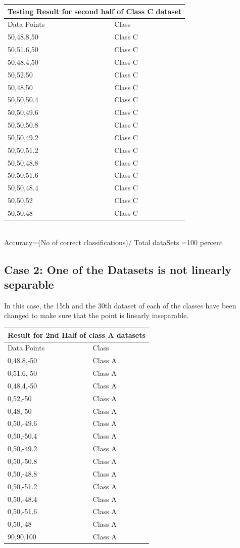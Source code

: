 \documentclass[letterpaper]{article}
\begin{document}
\begin{tabular}{ |p{5cm}||p{5cm}| }
 \hline
 \multicolumn{2}{|c|}{Testing Result for second half of Class C dataset} \\
 \hline
Data Points& Class\\
 \hline
50,48.8,50 & Class C \\
50,51.6,50 & Class C \\
50,48.4,50 & Class C \\
50,52,50 & Class C \\
50,48,50 & Class C \\
50,50,50.4 & Class C \\
50,50,49.6 & Class C \\
50,50,50.8 & Class C \\
50,50,49.2 & Class C \\
50,50,51.2 & Class C \\
50,50,48.8 & Class C \\
50,50,51.6 & Class C \\
50,50,48.4 & Class C \\
50,50,52 & Class C \\
50,50,48 & Class C \\
 \hline

\end {tabular} \\

Accuracy=(No of correct classifications)/ Total dataSets =100 percent 


\subsection {Case 2: One of the Datasets is not linearly separable}
In this case, the 15th and the 30th dataset of each of the classes have been changed to make sure that the point is linearly inseparable. 

  \begin{tabular}{ |p{5cm}||p{5cm}| }
 \hline
 \multicolumn{2}{|c|}{Result for 2nd Half of class A datasets} \\
 \hline
Data Points& Class\\
 \hline
0,48.8,-50 & Class A \\
0,51.6,-50 & Class A \\
0,48.4,-50 &  Class A \\
0,52,-50 &  Class A  \\
0,48,-50 &  Class A \\
0,50,-49.6 &  Class A \\
0,50,-50.4 &   Class A \\
0,50,-49.2 &  Class A \\
0,50,-50.8 &  Class A \\
0,50,-48.8 &  Class A \\
0,50,-51.2 &  Class A \\
0,50,-48.4 &  Class A \\
0,50,-51.6 &  Class A \\
0,50,-48 &  Class A \\
90,90,100 &  Class A \\
 
 \hline


\end{tabular}
\end{document}
